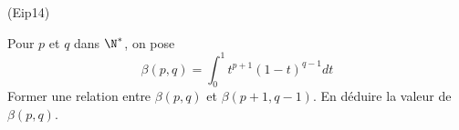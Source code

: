 \begin{tiny}(Eip14)\end{tiny} Pour $p$ et $q$ dans $\N^*$, on pose
\begin{displaymath}
 \beta(p,q)=
\int_0^1t^{p+1}(1-t)^{q-1}dt
\end{displaymath}
Former une relation entre $\beta(p,q)$ et $\beta(p+1,q-1)$. En déduire la valeur de $\beta(p,q)$.